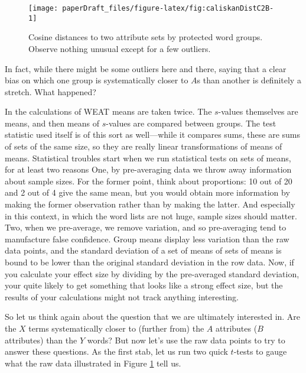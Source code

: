 \documentclass[
  10pt,
  dvipsnames,enabledeprecatedfontcommands]{scrartcl}
\begin{document}
\begin{figure}[H]

\begin{center}\texttt{[image: paperDraft\_files/figure-latex/fig:caliskanDistC2B-1]} \end{center}

\caption{Cosine distances to two attribute sets by protected word groups. Observe nothing unusual except for a few outliers.}
\label{fig:caliskanDistances}
\end{figure}

\noindent In fact, while there might be some outliers here and there,
saying that a clear bias on which one group is systematically closer to
\(A\)s than another is definitely a stretch. What happened?

In the calculations of WEAT means are taken twice. The \(s\)-values
themselves are means, and then means of \(s\)-values are compared
between groups. The test statistic used itself is of this sort as
well---while it compares sums, these are sums of sets of the same size,
so they are really linear transformations of means of means. Statistical
troubles start when we run statistical tests on sets of means, for at
least two reasons One, by pre-averaging data we throw away information
about sample sizes. For the former point, think about proportions: 10
out of 20 and 2 out of 4 give the same mean, but you would obtain more
information by making the former observation rather than by making the
latter. And especially in this context, in which the word lists are not
huge, sample sizes should matter. Two, when we pre-average, we remove
variation, and so pre-averaging tend to manufacture false confidence.
Group means display less variation than the raw data points, and the
standard deviation of a set of means of sets of means is bound to be
lower than the original standard deviation in the row data. Now, if you
calculate your effect size by dividing by the pre-averaged standard
deviation, your quite likely to get something that looks like a strong
effect size, but the results of your calculations might not track
anything interesting.

So let us think again about the question that we are ultimately
interested in. Are the \(X\) terms systematically closer to (further
from) the \(A\) attributes (\(B\) attributes) than the \(Y\) words? But
now let's use the raw data points to try to answer these questions. As
the first stab, let us run two quick \(t\)-tests to gauge what the raw
data illustrated in Figure \ref{fig:caliskanDistances} tell us.
\end{document}
